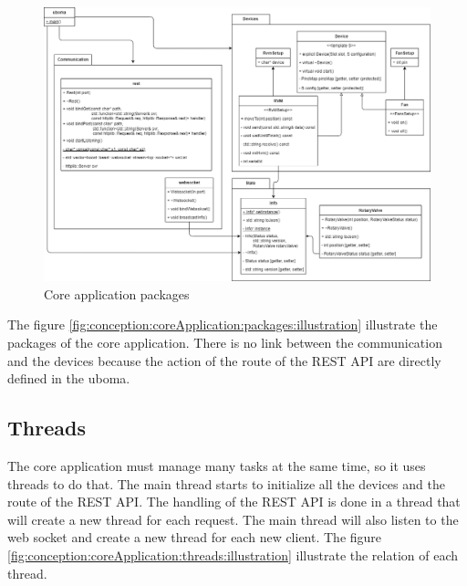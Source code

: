 \begin{figure}[ht]
  \centering
  \includegraphics[width=1\textwidth]{img/conception_packages.drawio.png}
  \caption{Core application packages}
  \label{fig:conception:core-application:packages:illustration}
\end{figure}

The figure \ref{fig:conception:coreApplication:packages:illustration} illustrate the packages of the core application.
There is no link between the communication and the devices because the action of the route of the REST API are directly defined in the uboma.

\subsection{Threads}
\label{conception:core-application:threads}

The core application must manage many tasks at the same time, so it uses threads to do that.
The main thread starts to initialize all the devices and the route of the REST API.
The handling of the REST API is done in a thread that will create a new thread for each request.
The main thread will also listen to the web socket and create a new thread for each new client.
The figure \ref{fig:conception:coreApplication:threads:illustration} illustrate the relation of each thread.

